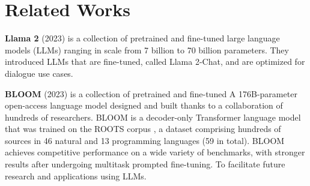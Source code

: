 \documentclass[fleqn,moreauthors,10pt]{ds_report}
\begin{document}
	



\section*{Related Works}

\noindent
\textbf{Llama 2} (2023) \cite{touvron2023llama} is a collection of pretrained and fine-tuned
large language models (LLMs) ranging in scale from 7 billion to 70 billion parameters.
They introduced LLMs that are fine-tuned, called Llama 2-Chat, and are optimized for dialogue use cases.

\noindent
\textbf{BLOOM} (2023) \cite{touvron2023llama} is a collection of pretrained and fine-tuned
A 176B-parameter open-access language model designed and built thanks to a collaboration of hundreds of researchers. BLOOM is a decoder-only Transformer language model that was trained on the ROOTS corpus \cite{laurençon2023bigscience}, a dataset comprising hundreds of
sources in 46 natural and 13 programming languages (59 in total). BLOOM achieves competitive performance on a wide variety of benchmarks, with stronger results after undergoing multitask prompted fine-tuning. To facilitate future research and applications using LLMs.
\end{document}
